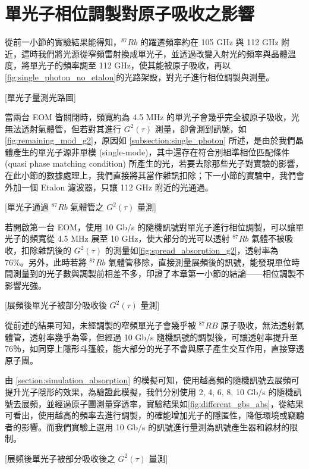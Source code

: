 \documentclass[class=NCU_thesis, crop=false]{standalone}
\begin{document}
\section{單光子相位調製對原子吸收之影響}
從前一小節的實驗結果能得知，$^{87}Rb$ 的躍遷頻率約在 105 GHz 與 112 GHz 附近，這時我們將光源從窄頻雷射換成單光子，並透過改變入射光的頻率與晶體溫度，將單光子的頻率調至 112 GHz，使其能被原子吸收，再以\cref{fig:single_photon_no_etalon}的光路架設，對光子進行相位調製與測量。

[單光子量測光路圖]

當兩台 EOM 皆關閉時，頻寬約為 4.5 MHz 的單光子會幾乎完全被原子吸收，光無法透射氣體管，但若對其進行 $G^{2}(\tau)$ 測量，卻會測到訊號，如\cref{fig:remaining_mod_g2}，原因如 \ref{subsection:single_photon} 所述，是由於我們晶體產生的單光子源非單模 (single-mode)，其中還存在符合別組準相位匹配條件 (quasi phase matching condition) 所產生的光，若要去除那些光子對實驗的影響，在此小節的數據處理上，我們直接將其當作雜訊扣除；下一小節的實驗中，我們會外加一個 Etalon 濾波器，只讓 112 GHz 附近的光通過。

[單光子通過 $^{87}Rb$ 氣體管之 $G^{2}(\tau)$ 量測]

若開啟第一台 EOM，使用 10 Gb/s 的隨機訊號對單光子進行相位調製，可以讓單光子的頻寬從 4.5 MHz 展至 10 GHz，使大部分的光可以透射 $^{87}Rb$ 氣體不被吸收，扣除雜訊後的 $G^2(\tau)$ 的測量如\cref{fig:spread_absorption_g2}，透射率為 76\%。另外，此時若將 $^{87}Rb$ 氣體管移除，直接測量展頻後的訊號，能發現單位時間測量到的光子數與調製前相差不多，印證了本章第一小節的結論——相位調製不影響光強。

[展頻後單光子被部分吸收後 $G^{2}(\tau)$ 量測]

從前述的結果可知，未經調製的窄頻單光子會幾乎被 $^{87}RB$ 原子吸收，無法透射氣體管，透射率幾乎為零，但經過 10 Gb/s 隨機訊號的調製後，可讓透射率提升至 76％，如同穿上隱形斗篷般，能大部分的光子不會與原子產生交互作用，直接穿透原子團。

由 \ref{section:simulation_absorption} 的模擬可知，使用越高頻的隨機訊號去展頻可提升光子隱形的效果，為驗證此模擬，我們分別使用 2, 4, 6, 8, 10 Gb/s 的隨機訊號去展頻，並經過原子團測量穿透率，實驗結果如\cref{fig:different_gbs_abs}，從結果可看出，使用越高的頻率去進行調製，的確能增加光子的隱匿性，降低環境或竊聽者的影響。而我們實驗上選用 10 Gb/s 的訊號進行量測為訊號產生器和線材的限制。


[展頻後單光子被部分吸收後之 $G^{2}(\tau)$ 量測]
\end{document}
